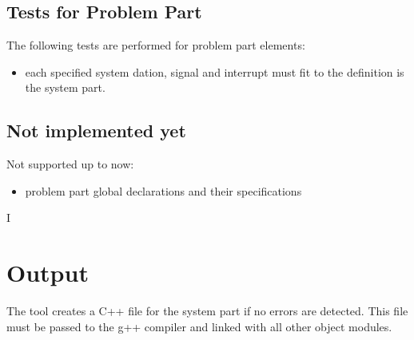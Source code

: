 \subsection{Tests for Problem Part}
The following tests are performed for problem part elements:
\begin{itemize}
\item each specified system dation, signal and interrupt must fit
  to the definition is the system part.
\end{itemize}

\subsection{Not implemented yet}
Not supported up to now:
\begin{itemize}
\item problem part global declarations and their specifications
\end{itemize}I

\section{Output}
The tool creates a C++ file for the system part if no errors are
detected. 
This file must be passed to the g++ compiler and linked with all 
other object modules.

